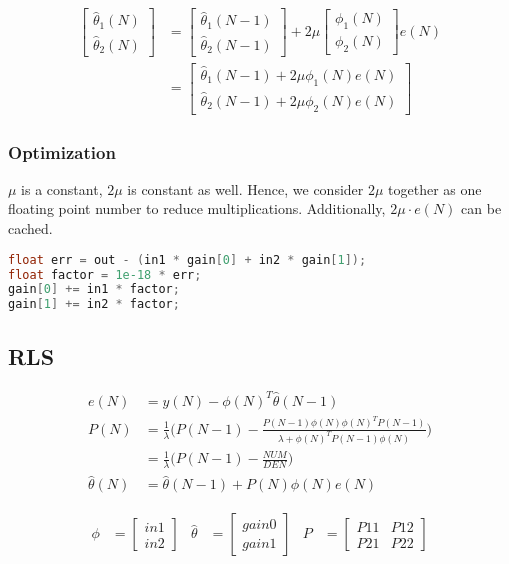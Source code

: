 \documentclass{article}
\begin{document}
\begin{align*}
\begin{bmatrix}
\hat{\theta}_1(N)\\
\hat{\theta}_2(N)
\end{bmatrix}
&=
\begin{bmatrix}
\hat{\theta}_1(N-1)\\
\hat{\theta}_2(N-1)
\end{bmatrix}
+ 2 \mu
\begin{bmatrix}
\phi_1(N)\\
\phi_2(N)
\end{bmatrix}
e(N)\\
&=
\begin{bmatrix}
\hat{\theta}_1(N-1) + 2\mu \phi_1(N) e(N)\\
\hat{\theta}_2(N-1) + 2\mu \phi_2(N) e(N)
\end{bmatrix}
\end{align*}

\subsubsection*{Optimization}
$\mu$ is a constant, $2\mu$ is constant as well. Hence, we consider $2\mu$ together as one floating point number to reduce multiplications. Additionally, $2\mu \cdot e(N)$ can be cached.

\begin{lstlisting}[language={C}]
float err = out - (in1 * gain[0] + in2 * gain[1]);
float factor = 1e-18 * err;
gain[0] += in1 * factor;
gain[1] += in2 * factor;
\end{lstlisting}

\subsection*{RLS}

\begin{align*}
e(N) &= y(N) - \phi(N)^T \hat{\theta}(N-1)\\
P(N) &= \frac{1}{\lambda} \Big( P(N-1) - \frac{P(N-1) \phi(N) \phi(N)^T P(N-1)}{\lambda + \phi(N)^T P(N-1) \phi(N)} \Big)\\
&= \frac{1}{\lambda} \Big( P(N-1) - \frac{NUM}{DEN} \Big)\\
\hat{\theta}(N) &= \hat{\theta}(N-1) + P(N) \phi(N) e(N)
\end{align*}

\begin{align*}
\phi &=
\begin{bmatrix}
in1\\
in2
\end{bmatrix}
&\hat{\theta} &=
\begin{bmatrix}
gain0\\
gain1
\end{bmatrix}
&P &=
\begin{bmatrix}
P11 & P12\\
P21 & P22
\end{bmatrix}
\end{align*}
\end{document}
